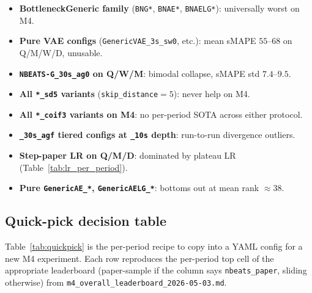 \documentclass{article}
\begin{document}
\begin{itemize}\itemsep -1pt
\item \textbf{BottleneckGeneric family} (\texttt{BNG*}, \texttt{BNAE*}, \texttt{BNAELG*}): universally worst on M4.
\item \textbf{Pure VAE configs} (\texttt{GenericVAE\_3s\_sw0}, etc.): mean sMAPE $55$--$68$ on Q/M/W/D, unusable.
\item \textbf{\texttt{NBEATS-G\_30s\_ag0} on Q/W/M}: bimodal collapse, sMAPE std $7.4$--$9.5$.
\item \textbf{All \texttt{*\_sd5} variants} (\texttt{skip\_distance}$=5$): never help on M4.
\item \textbf{All \texttt{*\_coif3} variants on M4}: no per-period SOTA across either protocol.
\item \textbf{\texttt{\_30s\_agf} tiered configs at \texttt{\_10s} depth}: run-to-run divergence outliers.
\item \textbf{Step-paper LR on Q/M/D}: dominated by plateau LR (Table~\ref{tab:lr_per_period}).
\item \textbf{Pure \texttt{GenericAE\_*}, \texttt{GenericAELG\_*}}: bottoms out at mean rank $\approx 38$.
\end{itemize}

\subsection{Quick-pick decision table}
\label{app:hyperparams:quickpick}

Table~\ref{tab:quickpick} is the per-period recipe to copy into a YAML config for a new M4 experiment. Each row reproduces the per-period top cell of the appropriate leaderboard (paper-sample if the column says \texttt{nbeats\_paper}, sliding otherwise) from \texttt{m4\_overall\_leaderboard\_2026-05-03.md}.
\end{document}
